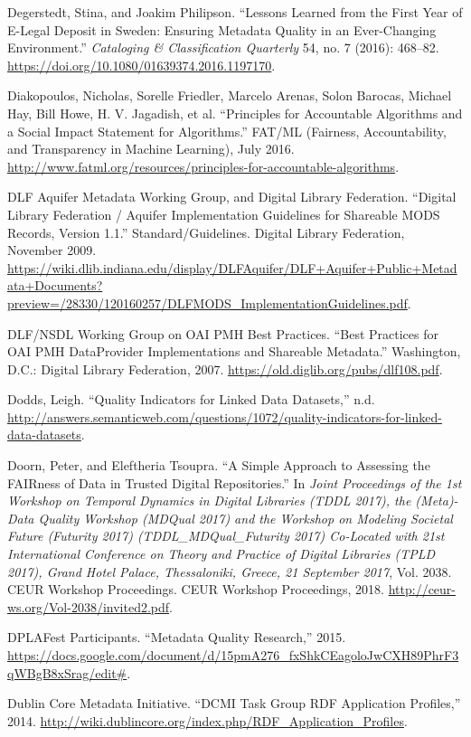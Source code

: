 Degerstedt, Stina, and Joakim Philipson. “Lessons Learned from the First Year of E-Legal Deposit in Sweden: Ensuring Metadata Quality in an Ever-Changing Environment.” \emph{Cataloging \& Classification Quarterly} 54, no. 7 (2016): 468–82. \url{https://doi.org/10.1080/01639374.2016.1197170}.

Diakopoulos, Nicholas, Sorelle Friedler, Marcelo Arenas, Solon Barocas, Michael Hay, Bill Howe, H. V. Jagadish, et al. “Principles for Accountable Algorithms and a Social Impact Statement for Algorithms.” FAT/ML (Fairness, Accountability, and Transparency in Machine Learning), July 2016. \url{http://www.fatml.org/resources/principles-for-accountable-algorithms}.

DLF Aquifer Metadata Working Group, and Digital Library Federation. “Digital Library Federation / Aquifer Implementation Guidelines for Shareable MODS Records, Version 1.1.” Standard/Guidelines. Digital Library Federation, November 2009. \url{https://wiki.dlib.indiana.edu/display/DLFAquifer/DLF+Aquifer+Public+Metadata+Documents?preview=/28330/120160257/DLFMODS_ImplementationGuidelines.pdf}.

DLF/NSDL Working Group on OAI PMH Best Practices. “Best Practices for OAI PMH DataProvider Implementations and Shareable Metadata.” Washington, D.C.: Digital Library Federation, 2007. \url{https://old.diglib.org/pubs/dlf108.pdf}.

Dodds, Leigh. “Quality Indicators for Linked Data Datasets,” n.d. \url{http://answers.semanticweb.com/questions/1072/quality-indicators-for-linked-data-datasets}.

Doorn, Peter, and Eleftheria Tsoupra. “A Simple Approach to Assessing the FAIRness of Data in Trusted Digital Repositories.” In \emph{Joint Proceedings of the 1st Workshop on Temporal Dynamics in Digital Libraries (TDDL 2017), the (Meta)-Data Quality Workshop (MDQual 2017) and the Workshop on Modeling Societal Future (Futurity 2017) (TDDL\_MDQual\_Futurity 2017) Co-Located with 21st International Conference on Theory and Practice of Digital Libraries (TPLD 2017), Grand Hotel Palace, Thessaloniki, Greece, 21 September 2017}, Vol. 2038. CEUR Workshop Proceedings. CEUR Workshop Proceedings, 2018. \url{http://ceur-ws.org/Vol-2038/invited2.pdf}.

DPLAFest Participants. “Metadata Quality Research,” 2015. \url{https://docs.google.com/document/d/15pmA276_fxShkCEagoloJwCXH89PhrF3qWBgB8xSrag/edit#}.

Dublin Core Metadata Initiative. “DCMI Task Group RDF Application Profiles,” 2014. \url{http://wiki.dublincore.org/index.php/RDF_Application_Profiles}.

